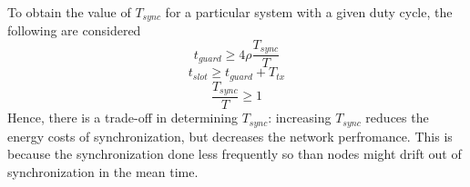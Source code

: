 \documentclass[a4paper,10pt]{report}
\begin{document}
\paragraph*{}
To obtain the value of $T_{sync}$ for a particular system with a given duty cycle, the following are considered
\begin{equation}
t_{guard} \geq 4\rho \dfrac{T_{sync}}{T}
\end{equation}
\begin{equation}
t_{slot} \geq t_{guard} + T_{tx}
\end{equation}
\begin{equation}
\dfrac{T_{sync}}{T} \geq 1
\end{equation}
Hence, there is a trade-off in determining $T_{sync}$: increasing
$T_{sync}$ reduces the energy costs of synchronization, but
decreases the network perfromance. This is because the
synchronization done less frequently so than nodes might drift out
of synchronization in the mean time.
\end{document}
